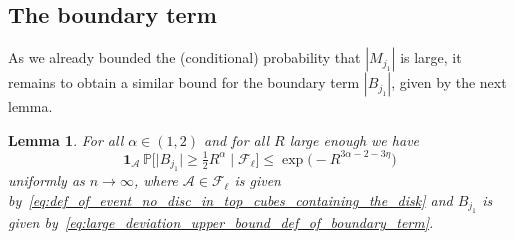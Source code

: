\documentclass[11pt]{amsart}
\newtheorem{lemma}[theorem]{Lemma}
\theoremstyle{definition}
\theoremstyle{remark}
\numberwithin{equation}{section}
\newcommand{\bP}{\mathbb P}
\begin{document}
	\subsection{The boundary term}
	As we already bounded the (conditional) probability that $|M_{j_1}|$ is large, it remains to obtain a similar bound for the boundary term $|B_{j_1}|$, given by the next lemma.
	\begin{lemma}
		\label{lemma:large_deviations_upper_bound_boundary_term}
		For all $\alpha\in(1,2)$ and for all $R$ large enough we have
		\[
		\mathbf{1}_{\mathcal{A}} \, \bP\Big[\big| B_{j_1} \big| \ge \tfrac{1}{2} R^{\alpha} \mid \mathcal{F}_\ell\Big] \le \exp\Big(-R^{3\alpha -2 - 3\eta}\Big)
		\]
		uniformly as $n\to \infty$, where $\mathcal{A}\in \mathcal{F}_{\ell}$ is given by~\eqref{eq:def_of_event_no_disc_in_top_cubes_containing_the_disk} and $B_{j_1}$ is given by~\eqref{eq:large_deviation_upper_bound_def_of_boundary_term}.
	\end{lemma} 
\end{document}
